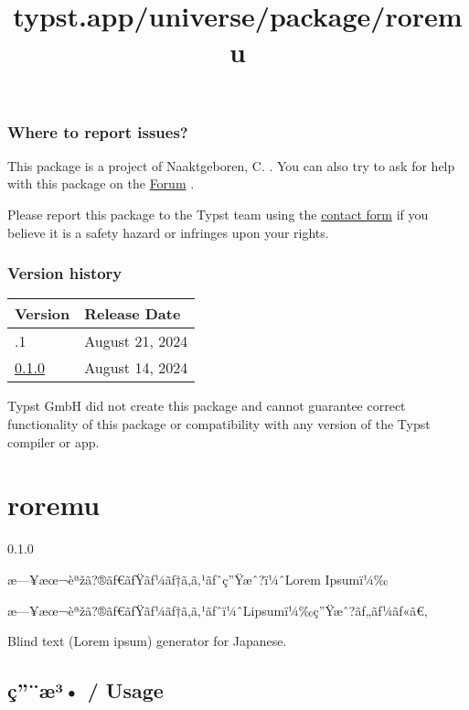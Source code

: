 \subsubsection{Where to report issues?}\label{where-to-report-issues}

This package is a project of Naaktgeboren, C. . You can also try to ask
for help with this package on the \href{https://forum.typst.app}{Forum}
.

Please report this package to the Typst team using the
\href{https://typst.app/contact}{contact form} if you believe it is a
safety hazard or infringes upon your rights.

\label{versions}
\subsubsection{Version history}\label{version-history}

\begin{longtable}[]{@{}ll@{}}
\toprule\noalign{}
Version & Release Date \\
\midrule\noalign{}
\endhead
\bottomrule\noalign{}
\endlastfoot
0.1.1 & August 21, 2024 \\
\href{https://typst.app/universe/package/untypsignia/0.1.0/}{0.1.0} &
August 14, 2024 \\
\end{longtable}

Typst GmbH did not create this package and cannot guarantee correct
functionality of this package or compatibility with any version of the
Typst compiler or app.


\title{typst.app/universe/package/roremu}

\label{banner}
\section{roremu}\label{roremu}

{ 0.1.0 }

æ---¥æœ¬èªžã?®ãƒ€ãƒŸãƒ¼ãƒ†ã‚­ã‚¹ãƒˆç''Ÿæˆ?ï¼ˆLorem Ipsumï¼‰

\label{readme}
æ---¥æœ¬èªžã?®ãƒ€ãƒŸãƒ¼ãƒ†ã‚­ã‚¹ãƒˆï¼ˆLipsumï¼‰ç''Ÿæˆ?ãƒ„ãƒ¼ãƒ«ã€‚

Blind text (Lorem ipsum) generator for Japanese.

\subsection{ç''¨æ³• / Usage}\label{uxe7uxe6uxb3-usage}

